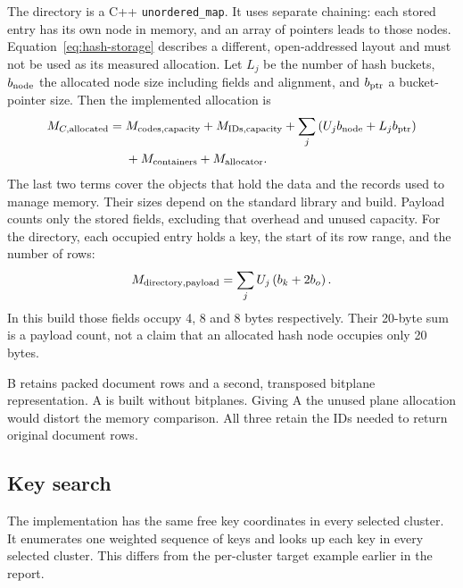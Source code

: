 The directory is a C++ \texttt{unordered\_map}. It uses separate chaining: each stored entry has its own node in memory, and an array of
pointers leads to those nodes. Equation~\eqref{eq:hash-storage}
describes a different, open-addressed layout and must not be used as its measured allocation.
Let $L_j$ be the number of hash buckets, $b_{\rm node}$ the allocated node size including fields
and alignment, and $b_{\rm ptr}$ a bucket-pointer size. Then the implemented allocation is
\begin{align}
M_{C,\rm allocated}={}&M_{\rm codes,capacity}+M_{\rm IDs,capacity}
 +\sum_j\left(U_j b_{\rm node}+L_j b_{\rm ptr}\right)\notag\\
 &+M_{\rm containers}+M_{\rm allocator}.
\label{eq:native-key-storage}
\end{align}
The last two terms cover the objects that hold the data and the records used to manage memory.
Their sizes depend on the standard library and build. Payload counts only the stored fields,
excluding that overhead and unused capacity. For the directory, each occupied entry holds a
key, the start of its row range, and the number of rows:
\[
M_{\rm directory,payload}=\sum_j U_j\left(b_k+2b_o\right).
\]
In this build those fields occupy 4, 8 and 8 bytes respectively. Their 20-byte sum is a payload
count, not a claim that an allocated hash node occupies only 20 bytes.

B retains packed document rows and a second, transposed bitplane representation. A is built
without bitplanes. Giving A the unused plane allocation would distort the memory comparison.
All three retain the IDs needed to return original document rows.

\subsection{Key search}
The implementation has the same free key coordinates in every selected cluster. It enumerates
one weighted sequence of keys and looks up each key in every selected cluster. This differs
from the per-cluster target example earlier in the report.

